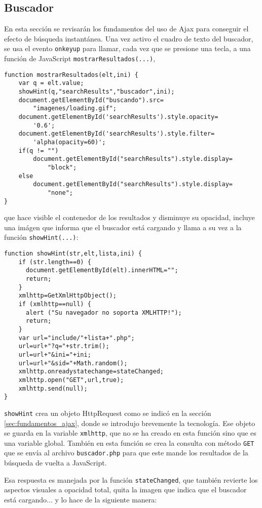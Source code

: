 \subsection{Buscador}

En esta sección se revisarán los fundamentos del uso de Ajax para conseguir el
efecto de búsqueda instantánea. Una vez activo el cuadro de texto del buscador,
se usa el evento \verb|onkeyup| para llamar, cada vez que se presione una tecla,
a una función de JavaScript \verb|mostrarResultados(...)|,

\begin{lstlisting}
function mostrarResultados(elt,ini) {
	var q = elt.value;
	showHint(q,"searchResults","buscador",ini);
	document.getElementById("buscando").src=
		"imagenes/loading.gif";
	document.getElementById('searchResults').style.opacity=
		'0.6';
	document.getElementById('searchResults').style.filter=
		'alpha(opacity=60)';
	if(q != "")
		document.getElementById("searchResults").style.display=
			"block";
	else
		document.getElementById("searchResults").style.display=
			"none";
}
\end{lstlisting}

que hace visible el contenedor de los resultados y disminuye su opacidad,
incluye una imágen que informa que el buscador está cargando y llama a su vez a
la función \verb|showHint(...)|:

\begin{lstlisting}
function showHint(str,elt,lista,ini) {
	if (str.length==0) {
	  document.getElementById(elt).innerHTML="";
	  return;
	}
	xmlhttp=GetXmlHttpObject();
	if (xmlhttp==null) {
	  alert ("Su navegador no soporta XMLHTTP!");
	  return;
	}
	var url="include/"+lista+".php";
	url=url+"?q="+str.trim();
	url=url+"&ini="+ini;
	url=url+"&sid="+Math.random();
	xmlhttp.onreadystatechange=stateChanged;
	xmlhttp.open("GET",url,true);
	xmlhttp.send(null);
}
\end{lstlisting}

\verb|showHint| crea un objeto HttpRequest como se indicó en la sección
\ref{sec:fundamentos_ajax}, donde se introdujo brevemente la tecnología. Ese
objeto se guarda en la variable \verb|xmlhttp|, que no se ha creado en esta
función sino que es una variable global. También en esta función se crea la
consulta con método \verb|GET| que se envía al archivo \verb|buscador.php| para
que este mande los resultados de la búsqueda de vuelta a JavaScript.

Esa respuesta es manejada por la función \verb|stateChanged|, que también
revierte los aspectos visuales a opacidad total, quita la imagen que indica que
el buscador está cargando... y lo hace de la siguiente manera:

